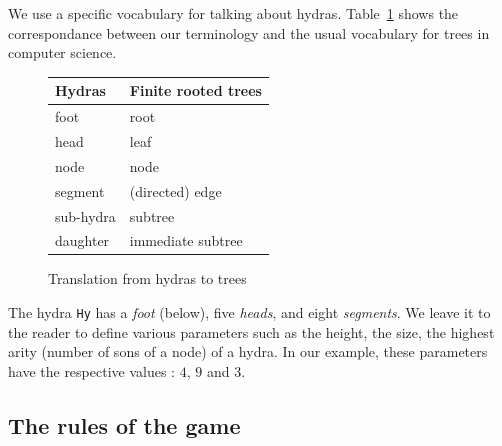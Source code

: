 We use a specific vocabulary for talking about hydras. Table~\ref{tab:hyd2tree} shows the correspondance between our terminology and the usual vocabulary for trees in computer science.


\begin{figure}[h]
  \centering
  \begin{tabular}{ll}
Hydras & Finite rooted trees\\
\hline
foot & root\\
head & leaf\\
node & node\\
segment  & (directed) edge \\
sub-hydra & subtree\\
daughter & immediate subtree\\
\end{tabular}
  \caption{Translation from hydras to trees}
  \label{tab:hyd2tree}
\end{figure}


The hydra \texttt{Hy} has a \emph{foot} (below), five \emph{heads}, and eight \emph{segments}. 
We leave it to the reader to define various parameters such as the height, the size, the highest arity (number of sons of a node) of a hydra. In our example, these parameters have the respective values : $4$, $9$ and $3$.




\subsection{The rules of the game}

\label{sec:orgheadline44}
\label{sect:replication-def}

